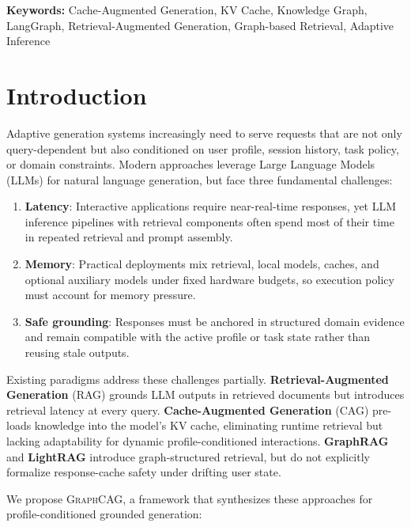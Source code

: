 \documentclass[11pt,a4paper,twocolumn]{article}
\newcommand{\graphcag}{\textsc{GraphCAG}}
\begin{document}
\textbf{Keywords:} Cache-Augmented Generation, KV Cache, Knowledge Graph, LangGraph, Retrieval-Augmented Generation, Graph-based Retrieval, Adaptive Inference

\section{Introduction}
\label{sec:intro}

Adaptive generation systems increasingly need to serve requests that are not only query-dependent but also conditioned on user profile, session history, task policy, or domain constraints. Modern approaches leverage Large Language Models (LLMs) for natural language generation, but face three fundamental challenges:

\begin{enumerate}[leftmargin=*]
  \item \textbf{Latency}: Interactive applications require near-real-time responses, yet LLM inference pipelines with retrieval components often spend most of their time in repeated retrieval and prompt assembly.
  \item \textbf{Memory}: Practical deployments mix retrieval, local models, caches, and optional auxiliary models under fixed hardware budgets, so execution policy must account for memory pressure.
  \item \textbf{Safe grounding}: Responses must be anchored in structured domain evidence and remain compatible with the active profile or task state rather than reusing stale outputs.
\end{enumerate}

Existing paradigms address these challenges partially. \textbf{Retrieval-Augmented Generation} (RAG) \cite{lewis2020rag} grounds LLM outputs in retrieved documents but introduces retrieval latency at every query. \textbf{Cache-Augmented Generation} (CAG) \cite{chan2024cag} pre-loads knowledge into the model's KV cache, eliminating runtime retrieval but lacking adaptability for dynamic profile-conditioned interactions. \textbf{GraphRAG} \cite{edge2024graphrag} and \textbf{LightRAG} \cite{guo2024lightrag} introduce graph-structured retrieval, but do not explicitly formalize response-cache safety under drifting user state.

We propose \graphcag{}, a framework that synthesizes these approaches for profile-conditioned grounded generation:
\end{document}

